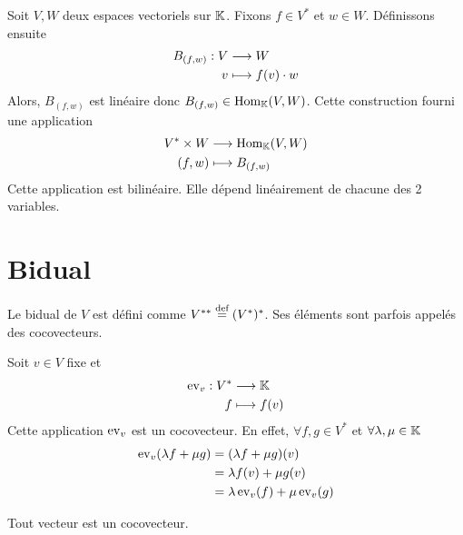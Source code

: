\begin{theoreme}
\end{theoreme}

\begin{remarque}
  Soit $V, W$ deux espaces vectoriels sur $\mathbb{K}$. Fixons $f \in V^*$ et $w \in W$. Définissons ensuite
  \begin{align*}
    B_{(f, w)}: V &\longrightarrow W \\
    v&\longmapsto f(v)\cdot w
  \end{align*}
  Alors, $B_{(f,w)}$ est linéaire donc $B_{(f, w)} \in \mathrm{Hom}_{\mathbb{K}}(V, W)$. Cette construction fourni une application
  \begin{align*}
    V^* \times W &\longrightarrow \mathrm{Hom}_{\mathbb{K}}(V, W) \\
    (f,w)& \longmapsto B_{(f, w)}
  \end{align*}
  Cette application est bilinéaire. Elle dépend linéairement de chacune des 2 variables.
\end{remarque}

\section{Bidual}
Le bidual de $V$ est défini comme $V^{**} \stackrel{\text{def}}{=} (V^*)^*$. Ses éléments sont parfois appelés des cocovecteurs.
\par Soit $v \in V$ fixe et
\begin{align*}
  \operatorname{ev}_v: V^* &\longrightarrow \mathbb{K} \\
  f&\longmapsto f(v)
\end{align*}
Cette application $\operatorname{ev}_v$ est un cocovecteur. En effet, $\forall f, g \in V^*$ et $\forall \lambda, \mu \in \mathbb{K}$ 
\begin{align*}
  \operatorname{ev}_v(\lambda f + \mu g) &= (\lambda f + \mu g)(v) \\
                           &= \lambda f(v) + \mu g(v) \\
                           &= \lambda \operatorname{ev}_v(f) + \mu \operatorname{ev}_v(g)
\end{align*}
\begin{remarque}
  Tout vecteur est un cocovecteur.
\end{remarque}

